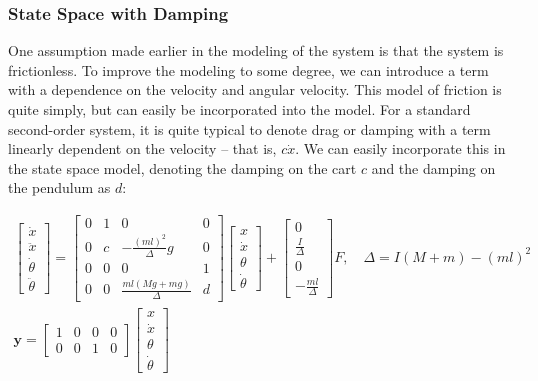 
\subsubsection{State Space with Damping}
One assumption made earlier in the modeling of the system is that the system is frictionless. To improve the modeling to some degree, we can introduce a term with a dependence on the velocity and angular velocity. This model of friction is quite simply, but can easily be incorporated into the model. For a standard second-order system, it is quite typical to denote drag or damping with a term linearly dependent on the velocity -- that is, $c\dot{x}$. We can easily incorporate this in the state space model, denoting the damping on the cart $c$ and the damping on the pendulum as $d$:

\begin{gather}
    \begin{bmatrix}
    \dot x\\\ddot{x}\\\dot\theta\\\ddot{\theta}
\end{bmatrix}=\begin{bmatrix}
    0&1&0&0\\0&c&-\frac{(ml)^2}{\Delta}g&0\\
    0&0&0&1\\0&0&\frac{ml\left(Mg+mg\right)}{\Delta}&d
\end{bmatrix}\begin{bmatrix}
      x\\\dot{x}\\\theta\\\dot{\theta}
\end{bmatrix}+\begin{bmatrix}
    0\\\frac{I}{\Delta}\\0\\-\frac {ml}{\Delta}
\end{bmatrix}F,\quad\Delta=I(M+m)-(ml)^2\\
\bm{y}=\begin{bmatrix}
    1&0&0&0\\0&0&1&0
\end{bmatrix}\begin{bmatrix}
      x\\\dot{x}\\\theta\\\dot{\theta}
\end{bmatrix}
\end{gather}


